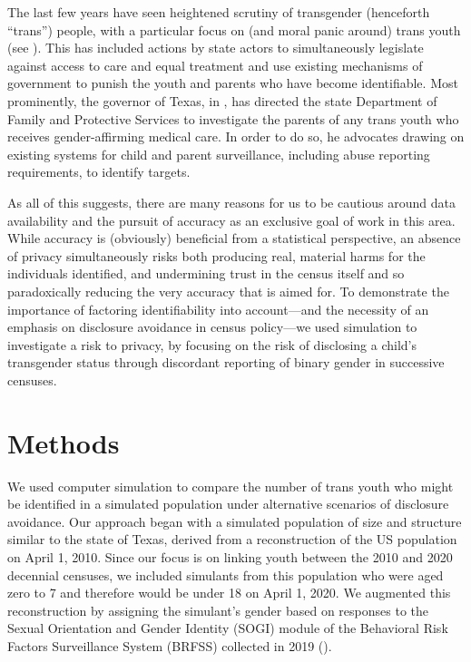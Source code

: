 \documentclass{jpc} %
\theoremstyle{plain}\newtheorem{satz}[thm]{Satz} %
\begin{document}
The last few years have seen heightened scrutiny of transgender (henceforth ``trans'') people, with a particular focus on (and moral panic around) trans youth (see \cite{slothouber2020trans}). This has included actions by state actors to simultaneously legislate against access to care and equal treatment and use existing mechanisms of government to punish the youth and parents who have become identifiable. Most prominently, the governor of Texas, in \cite{abbottletter}, has directed the state Department of Family and Protective Services to investigate the parents of any trans youth who receives gender-affirming medical care. In order to do so, he advocates drawing on existing systems for child and parent surveillance, including abuse reporting requirements, to identify targets.

As all of this suggests, there are many reasons for us to be cautious around data availability and the pursuit of accuracy as an exclusive goal of work in this area. While accuracy is (obviously) beneficial from a statistical perspective, an absence of privacy simultaneously risks both producing real, material harms for the individuals identified, and undermining trust in the census itself and so paradoxically reducing the very accuracy that is aimed for. To demonstrate the importance of factoring identifiability into account---and the necessity of an emphasis on disclosure avoidance in census policy---we used simulation to investigate a risk to privacy, by focusing on the risk of disclosing a child's transgender status through discordant reporting of binary gender in successive censuses.

 \section*{Methods}

We used computer simulation to compare the number of trans youth who might be identified in a simulated population under alternative scenarios of disclosure avoidance.  Our approach began with a simulated population of size and structure similar to the state of Texas, derived from a reconstruction of the US population on April 1, 2010.  Since our focus is on linking youth between the 2010 and 2020 decennial censuses, we included simulants from this population who were aged zero to 7 and therefore would be under 18 on April 1, 2020.  We augmented this reconstruction by assigning the simulant's gender based on responses to the Sexual Orientation and Gender Identity (SOGI) module of the Behavioral Risk Factors Surveillance System (BRFSS) collected in 2019 (\cite{brfss2019}). %
\end{document}
